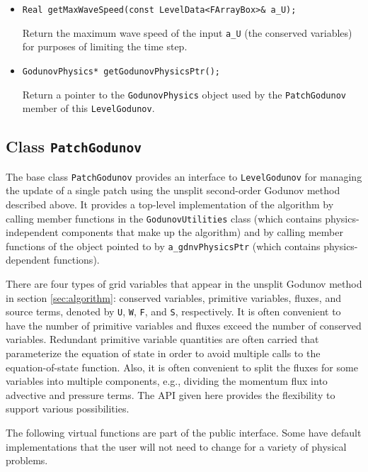\begin{itemize}
\item \begin{small} \begin{verbatim}
Real getMaxWaveSpeed(const LevelData<FArrayBox>& a_U);
\end{verbatim}\end{small}
Return the maximum wave speed of the input \verb/a_U/ (the conserved variables)
for purposes of limiting the time step.

\item \begin{small} \begin{verbatim}
GodunovPhysics* getGodunovPhysicsPtr();
\end{verbatim}\end{small}
Return a pointer to the \verb/GodunovPhysics/ object used by the \verb/PatchGodunov/
member of this \verb/LevelGodunov/. 
\end{itemize}

\subsection{Class {\tt PatchGodunov}}
The base class {\tt PatchGodunov} provides an interface to 
{\tt LevelGodunov} for managing the update of a single patch using the
unsplit second-order Godunov method described above. It provides a
top-level implementation of the algorithm by calling member functions
in the {\tt GodunovUtilities} class (which contains physics-independent 
components that make up the algorithm) and by calling member functions
of the object pointed to by \verb/a_gdnvPhysicsPtr/ (which contains
physics-dependent functions).

There are four types of grid variables that appear in the unsplit
Godunov method in section \ref{sec:algorithm}: conserved variables,
primitive variables, fluxes, and source terms, denoted by
{\tt U}, {\tt W}, {\tt F}, and {\tt S}, respectively. It is often
convenient to have the number of primitive variables and fluxes exceed
the number of conserved variables.  Redundant primitive variable
quantities are often carried that parameterize the equation of state 
in order to avoid multiple calls to the equation-of-state function.
Also, it is often convenient to split the fluxes for some variables
into multiple components, e.g., dividing the momentum flux into
advective and pressure terms.  The API given here provides the
flexibility to support various possibilities.

\vspace{0.1in}
\noindent
The following virtual functions are part of the public interface.  Some have
default implementations that the user will not need to change for a variety
of physical problems.

